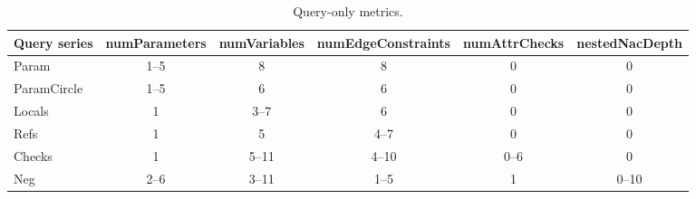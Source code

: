 \begin{table}[htb]
	\centering
	\footnotesize
	\begin{tabular}{|l|c|c|c|c|c|}
	\hline 
	\textbf{Query series} & \textbf{numParameters} & \textbf{numVariables} &
	\textbf{numEdgeConstraints} & \textbf{numAttrChecks} &
	\textbf{nestedNacDepth}\\ \hline Param & \cellcolor{blue!25}1--5 & 8 & 8 & 0 & 0\\ \hline ParamCircle & \cellcolor{blue!25}1--5 & 6 & 6 & 0 & 0\\ \hline
	Locals & 1 & \cellcolor{blue!25}3--7 & 6 & 0 & 0\\ \hline
	Refs & 1 & 5 & \cellcolor{blue!25}4--7 & 0 & 0\\ \hline
	Checks & 1 & 5--11 & 4--10 & \cellcolor{blue!25}0--6 & 0\\ \hline
	Neg & 2--6 & 3--11 & 1--5 & 1 & \cellcolor{blue!25}0--10\\ \hline
	\end{tabular}
	\caption{Query-only metrics.}
	\label{tab:queryonlymetrics}
\end{table}
